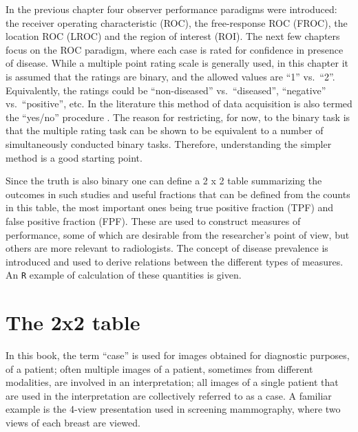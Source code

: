 \documentclass[
]{book}
\begin{document}
In the previous chapter four observer performance paradigms were introduced: the receiver operating characteristic (ROC), the free-response ROC (FROC), the location ROC (LROC) and the region of interest (ROI). The next few chapters focus on the ROC paradigm, where each case is rated for confidence in presence of disease. While a multiple point rating scale is generally used, in this chapter it is assumed that the ratings are binary, and the allowed values are ``1'' vs.~``2''. Equivalently, the ratings could be ``non-diseased'' vs.~``diseased'', ``negative'' vs.~``positive'', etc. In the literature this method of data acquisition is also termed the ``yes/no'' procedure \citep{green1966signal, egan1975book}. The reason for restricting, for now, to the binary task is that the multiple rating task can be shown to be equivalent to a number of simultaneously conducted binary tasks. Therefore, understanding the simpler method is a good starting point.

Since the truth is also binary one can define a 2 x 2 table summarizing the outcomes in such studies and useful fractions that can be defined from the counts in this table, the most important ones being true positive fraction (TPF) and false positive fraction (FPF). These are used to construct measures of performance, some of which are desirable from the researcher's point of view, but others are more relevant to radiologists. The concept of disease prevalence is introduced and used to derive relations between the different types of measures. An \texttt{R} example of calculation of these quantities is given.

\hypertarget{binary-task-2-2-table}{%
\section{The 2x2 table}\label{binary-task-2-2-table}}

In this book, the term ``case'' is used for images obtained for diagnostic purposes, of a patient; often multiple images of a patient, sometimes from different modalities, are involved in an interpretation; all images of a single patient that are used in the interpretation are collectively referred to as a case. A familiar example is the 4-view presentation used in screening mammography, where two views of each breast are viewed.
\end{document}
